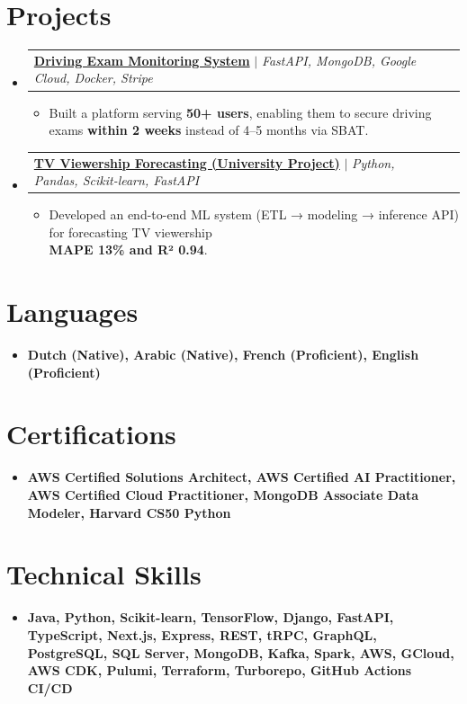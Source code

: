 \documentclass[letterpaper,11pt]{article}
\makeatletter
\newcommand{\resumeItem}[1]{
  \item\small{
    {#1 \vspace{-2pt}}
  }
}
\newcommand{\resumeProjectHeading}[2]{
    \item
    \begin{tabular*}{0.97\textwidth}{l@{\extracolsep{\fill}}r}
      \small#1 & #2 \\
    \end{tabular*}\vspace{-7pt}
}
\newcommand{\resumeSubHeadingListStart}{\begin{itemize}[leftmargin=0.15in, label={}]}
\newcommand{\resumeSubHeadingListEnd}{\end{itemize}}
\newcommand{\resumeItemListStart}{\begin{itemize}}
\newcommand{\resumeItemListEnd}{\end{itemize}\vspace{-5pt}}
\makeatother
\begin{document}
\section{Projects}
    \resumeSubHeadingListStart
    \resumeProjectHeading
        {\href{https://aziz-baatout.github.io/Rijexamenmeldingen/}{\textbf{Driving Exam Monitoring System}} $|$ \emph{FastAPI, MongoDB, Google Cloud, Docker, Stripe}}{}
        \resumeItemListStart 
        \resumeItem{Built a platform serving \textbf{50+ users}, enabling them to secure driving exams \textbf{within 2 weeks} instead of 4--5 months via SBAT.}
    \resumeItemListEnd
    \resumeProjectHeading
        {\href{https://aziz-baatout.github.io/tv-viewership-forecast/}{\textbf{TV Viewership Forecasting (University Project)}} $|$ \emph{Python, Pandas, Scikit-learn, FastAPI}}{}
        \resumeItemListStart
        \resumeItem{Developed an end-to-end ML system (ETL → modeling → inference API) for forecasting TV viewership \\ \textbf{MAPE 13\% and R² 0.94}.}
    \resumeItemListEnd
    \resumeSubHeadingListEnd
    
\section{Languages}
  \resumeSubHeadingListStart
    \item {
      \small{
        \textbf{Dutch (Native), Arabic (Native), French (Proficient), English (Proficient)}
      }
    }
  \resumeSubHeadingListEnd

\section{Certifications}
  \resumeSubHeadingListStart
    \item {
      \small{
        \textbf{AWS Certified Solutions Architect, AWS Certified AI Practitioner, AWS Certified Cloud Practitioner, MongoDB Associate Data Modeler, Harvard CS50 Python}
      }
    }
  \resumeSubHeadingListEnd

\section{Technical Skills}
  \resumeSubHeadingListStart
    \item {
      \small{
        \textbf{Java, Python, Scikit-learn, TensorFlow, Django, FastAPI, TypeScript, Next.js, Express, REST, tRPC, GraphQL, PostgreSQL, SQL Server, MongoDB, Kafka, Spark, AWS, GCloud, AWS CDK, Pulumi, Terraform, Turborepo, GitHub Actions CI/CD}
      }
    }
  \resumeSubHeadingListEnd
\end{document}
